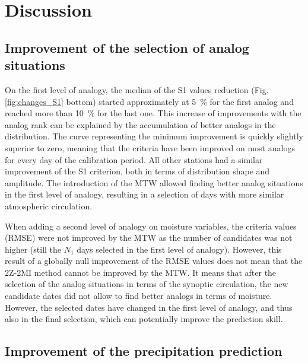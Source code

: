 \documentclass[hess, manuscript]{copernicus}
\begin{document}
\section{Discussion}
\label{sec:discussion}


\subsection{Improvement of the selection of analog situations}

On the first level of analogy, the median of the S1 values reduction (Fig. \ref{fig:changes_S1} bottom) started approximately at 5~\% for the first analog and reached more than 10~\% for the last one. This increase of improvements with the analog rank can be explained by the accumulation of better analogs in the distribution. The curve representing the minimum improvement is quickly slightly superior to zero, meaning that the criteria have been improved on most analogs for every day of the calibration period. All other stations had a similar improvement of the S1 criterion, both in terms of distribution shape and amplitude. The introduction of the MTW allowed finding better analog situations in the first level of analogy, resulting in a selection of days with more similar atmospheric circulation.

When adding a second level of analogy on moisture variables, the criteria values (RMSE) were not improved by the MTW as the number of candidates was not higher (still the $N_{1}$ days selected in the first level of analogy). However, this result of a globally null improvement of the RMSE values does not mean that the 2Z-2MI method cannot be improved by the MTW. It means that after the selection of the analog situations in terms of the synoptic circulation, the new candidate dates did not allow to find better analogs in terms of moisture. However, the selected dates have changed in the first level of analogy, and thus also in the final selection, which can potentially improve the prediction skill.


\subsection{Improvement of the precipitation prediction}
\end{document}
